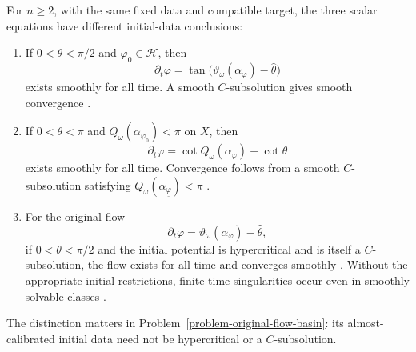 \documentclass[12pt,reqno]{amsart}
\numberwithin{equation}{section}
\theoremstyle{plain}
\theoremstyle{definition}
\newcommand{\cH}{\mathcal H}
\begin{document}
For $n\geq2$, with the same fixed data and compatible target, the three
scalar equations have different initial-data conclusions:
\begin{enumerate}
\item If $0<\theta<\pi/2$ and $\varphi_0\in\cH$, then
\[
 \partial_t\varphi=
 \tan\bigl(\vartheta_\omega(\alpha_\varphi)-\widehat\theta\bigr)
\]
exists smoothly for all time. A smooth $C$-subsolution gives smooth
convergence \cite[Theorem 1.4]{Tak20}.
\item If $0<\theta<\pi$ and
$Q_\omega(\alpha_{\varphi_0})<\pi$ on $X$, then
\[
 \partial_t\varphi=\cot Q_\omega(\alpha_\varphi)-\cot\theta
\]
exists smoothly for all time. Convergence follows from a smooth
$C$-subsolution satisfying $Q_\omega(\alpha_{\underline\varphi})<\pi$
\cite[Theorems 1.2--1.3]{FYZ25}.
\item For the original flow
\[
 \partial_t\varphi=\vartheta_\omega(\alpha_\varphi)-\widehat\theta,
\]
if $0<\theta<\pi/2$ and the initial potential is hypercritical
and is itself a $C$-subsolution, the flow exists for all time and
converges smoothly \cite[Theorem 1.3]{Tak20}. Without the
appropriate initial restrictions, finite-time singularities occur
even in smoothly solvable classes \cite{CJ25}.
\end{enumerate}
The distinction matters in
Problem~\ref{problem-original-flow-basin}: its almost-calibrated initial
data need not be hypercritical or a $C$-subsolution.
\end{document}
